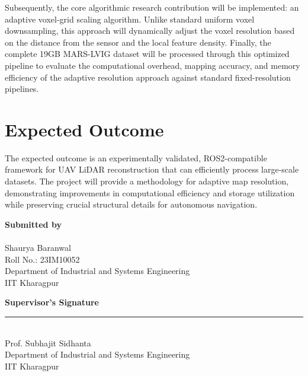 \documentclass[11pt,a4paper]{article}
\begin{document}
Subsequently, the core algorithmic research contribution will be implemented: an adaptive voxel-grid scaling algorithm. Unlike standard uniform voxel downsampling, this approach will dynamically adjust the voxel resolution based on the distance from the sensor and the local feature density. 
Finally, the complete 19GB MARS-LVIG dataset will be processed through this optimized pipeline to evaluate the computational overhead, mapping accuracy, and memory efficiency of the adaptive resolution approach against standard fixed-resolution pipelines.

\section*{Expected Outcome}
The expected outcome is an experimentally validated, ROS2-compatible framework for UAV LiDAR reconstruction that can efficiently process large-scale datasets. The project will provide a methodology for adaptive map resolution, demonstrating improvements in computational efficiency and storage utilization while preserving crucial structural details for autonomous navigation.

\vspace{2.0cm}

\noindent
\begin{minipage}[t]{0.5\textwidth}
    \textbf{Submitted by} \\
    \vspace{1.5cm} \\
    Shaurya Baranwal \\
    Roll No.: 23IM10052 \\
    Department of Industrial and Systems Engineering \\
    IIT Kharagpur
\end{minipage}
\hfill
\begin{minipage}[t]{0.45\textwidth}
    \begin{flushright}
        \textbf{Supervisor's Signature} \\
        \vspace{1.5cm} 
        \rule{6cm}{0.4pt} \\
        Prof. Subhajit Sidhanta \\
        Department of Industrial and Systems Engineering \\
        IIT Kharagpur
    \end{flushright}
\end{minipage}
\end{document}

